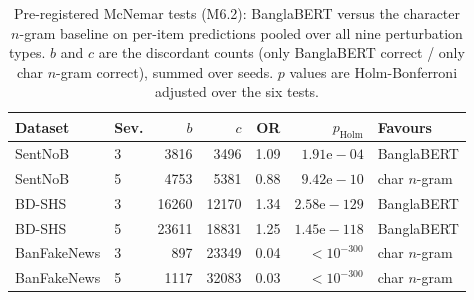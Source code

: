 \begin{table}[t]
\centering
\caption{Pre-registered McNemar tests (M6.2): BanglaBERT versus the character $n$-gram baseline on per-item predictions pooled over all nine perturbation types. $b$ and $c$ are the discordant counts (only BanglaBERT correct / only char $n$-gram correct), summed over seeds. $p$ values are Holm-Bonferroni adjusted over the six tests.}
\label{tab:mcnemar}
\begin{tabular}{llrrrrl}
\toprule
Dataset & Sev. & $b$ & $c$ & OR & $p_{\text{Holm}}$ & Favours \\
\midrule
SentNoB & 3 & 3816 & 3496 & 1.09 & $1.91\mathrm{e}-04$ & BanglaBERT \\
SentNoB & 5 & 4753 & 5381 & 0.88 & $9.42\mathrm{e}-10$ & char $n$-gram \\
BD-SHS & 3 & 16260 & 12170 & 1.34 & $2.58\mathrm{e}-129$ & BanglaBERT \\
BD-SHS & 5 & 23611 & 18831 & 1.25 & $1.45\mathrm{e}-118$ & BanglaBERT \\
BanFakeNews & 3 & 897 & 23349 & 0.04 & $<10^{-300}$ & char $n$-gram \\
BanFakeNews & 5 & 1117 & 32083 & 0.03 & $<10^{-300}$ & char $n$-gram \\
\bottomrule
\end{tabular}
\end{table}
